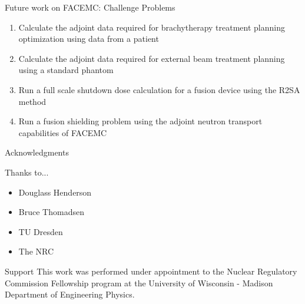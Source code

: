 \documentclass{beamer}
\begin{document}
\begin{frame}{Future work on FACEMC: Challenge Problems}
  
    \begin{enumerate}
      \item Calculate the adjoint data required for brachytherapy treatment 
        planning optimization using data from a patient
        \bigskip
      \item Calculate the adjoint data required for external beam treatment 
        planning using a standard phantom
        \bigskip
      \item Run a full scale shutdown dose calculation for a fusion device using
        the R2SA method
        \bigskip
      \item Run a fusion shielding problem using the adjoint neutron transport 
        capabilities of FACEMC
    \end{enumerate}
  
\end{frame}

\begin{frame}{Acknowledgments}

  Thanks to...
  
  \begin{itemize}
    \item Douglass Henderson
    \item Bruce Thomadsen
    \item TU Dresden
    \item The NRC
  \end{itemize}

  \medskip \medskip \medskip \medskip \medskip \medskip \medskip

  \begin{beamerboxesrounded}[upper=boxheadcolor,lower=boxbodycolor,shadow=true]{Support}
    This work was performed under appointment to the Nuclear Regulatory
    Commission Fellowship program at the University of Wisconsin - Madison
    Department of Engineering Physics.
  \end{beamerboxesrounded}

\end{frame}
\end{document}
